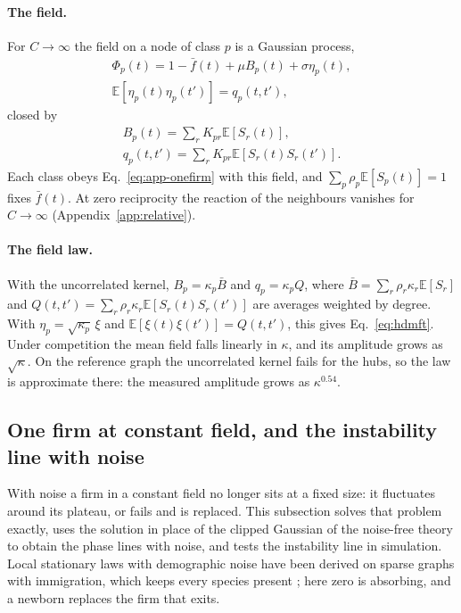 \documentclass[pre,twocolumn,superscriptaddress,nofootinbib]{revtex4-2}
\newcommand{\E}{\mathbb E}
\newcommand{\fb}{\bar f}
\begin{document}
\paragraph{The field.}  For $C\to\infty$ the field on a node of class $p$ is a Gaussian process,
\begin{equation}
\begin{gathered}
\Phi_p(t)=1-\fb(t)+\mu B_p(t)+\sigma\eta_p(t),\\
\E[\eta_p(t)\eta_p(t')]=q_p(t,t'),
\end{gathered}
\end{equation}
closed by
\begin{equation}
\begin{gathered}
B_p(t)=\sum_rK_{pr}\E[S_r(t)],\\
q_p(t,t')=\sum_rK_{pr}\E[S_r(t)S_r(t')] .
\end{gathered}
\label{eq:app-closure}
\end{equation}
Each class obeys Eq.~\eqref{eq:app-onefirm} with this field, and $\sum_p\rho_p\E[S_p(t)]=1$ fixes $\fb(t)$.  At
zero reciprocity the reaction of the neighbours vanishes for $C\to\infty$ (Appendix~\ref{app:relative}).

\paragraph{The field law.}  With the uncorrelated kernel, $B_p=\kappa_p\bar B$ and $q_p=\kappa_pQ$, where
$\bar B=\sum_r\rho_r\kappa_r\E[S_r]$ and $Q(t,t')=\sum_r\rho_r\kappa_r\E[S_r(t)S_r(t')]$ are averages weighted by
degree.  With $\eta_p=\sqrt{\kappa_p}\,\xi$ and $\E[\xi(t)\xi(t')]=Q(t,t')$, this gives Eq.~\eqref{eq:hdmft}.
Under competition the mean field falls linearly in $\kappa$, and its amplitude grows as $\sqrt\kappa$.  On the
reference graph the uncorrelated kernel fails for the hubs, so the law is approximate there: the measured
amplitude grows as $\kappa^{0.54}$.

\subsection{One firm at constant field, and the instability line with noise}
\label{app:constant}

With noise a firm in a constant field no longer sits at a fixed size: it fluctuates around its plateau, or fails
and is replaced.  This subsection solves that problem exactly, uses the solution in place of the clipped Gaussian
of the noise-free theory \cite{aguirrelopez,patil2026} to obtain the phase lines with noise, and tests the instability line in simulation.
Local stationary laws with demographic noise have been derived on sparse graphs with immigration, which keeps
every species present \cite{machado2025}; here zero is absorbing, and a newborn replaces the firm that exits.
\end{document}
